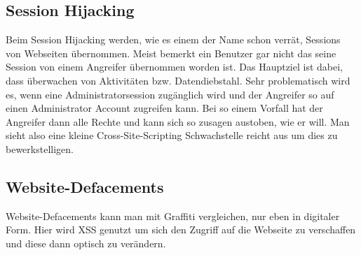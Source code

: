 \subsection{Session Hijacking}
\label{sec:xss_session_hijacking}
Beim Session Hijacking werden, wie es einem der Name schon verrät, Sessions von Webseiten übernommen. Meist bemerkt ein Benutzer gar nicht das seine Session von einem Angreifer übernommen worden ist. Das Hauptziel ist dabei, dass überwachen von Aktivitäten bzw. Datendiebstahl. Sehr problematisch wird es, wenn eine Administratorsession zugänglich wird und der Angreifer so auf einen Administrator Account zugreifen kann. Bei so einem Vorfall hat der Angreifer dann alle Rechte und kann sich so zusagen austoben, wie er will. Man sieht also eine kleine Cross-Site-Scripting Schwachstelle reicht aus um dies zu bewerkstelligen. 
\subsection{Website-Defacements}
\label{sec:xss_web_def}
Website-Defacements kann man mit Graffiti vergleichen, nur eben in digitaler Form. Hier wird XSS genutzt um sich den Zugriff auf die Webseite zu verschaffen und diese dann optisch zu verändern. 
